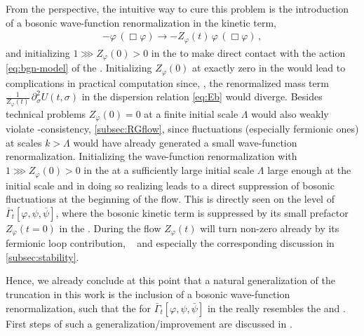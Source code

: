 From the \frg{} perspective, the intuitive way to cure this problem is the introduction of a bosonic wave-function renormalization in the kinetic term,
\begin{align}
	- \varphi \, ( \Box \varphi ) \rightarrow - Z_{\varphi} ( t ) \, \varphi \, ( \Box \varphi ) \, ,
\end{align}
and initializing ${1 \ggg Z_{\varphi} ( 0 )>0}$ in the \uv{} to make direct contact with the action \eqref{eq:bgn-model} of the \bgnm{}.
Initializing $Z_{\varphi} ( 0 )$ at exactly zero in the \uv{} would lead to complications in practical computation since, \eg{}, the renormalized mass term $\tfrac{1}{Z_\varphi ( t )} \, \partial_\sigma^2 U ( t, \sigma )$ in the dispersion relation \eqref{eq:Eb} would diverge. Besides technical problems $Z_{\varphi} ( 0 )=0$ at a finite \uv{} initial scale $\Lambda$ would also weakly violate \rg{}-consistency, \cf{} \cref{subsec:RGflow}, since fluctuations (especially fermionic ones) at scales $k>\Lambda$ would have already generated a small wave-function renormalization.
Initializing the wave-function renormalization with ${1 \ggg Z_{\varphi} ( 0 )>0}$ in the \uv{} at a sufficiently large \uv{} initial scale $\Lambda$ \dash{} large enough  at the initial scale and in doing so realizing \rgcy{} \dash{} leads to a direct suppression of bosonic fluctuations at the beginning of the \frg{} flow.
This is directly seen on the level of $\bar{\Gamma}_t [\varphi, \psi,\bar{\psi}]$, where the bosonic kinetic term is suppressed by its small prefactor $Z_\varphi ( t = 0 )$ in the \uv{}.
During the \frg{} flow $Z_\varphi ( t )$ will turn non-zero already by its fermionic loop contribution, \cf{}\  and especially the corresponding discussion in \cref{subsec:stability}.
	
Hence, we already conclude at this point that a natural generalization of the \lpa{} truncation in this work is the inclusion of a bosonic wave-function renormalization, such that the \uv{} \ic{} for $\bar{\Gamma}_t [ \varphi, \psi,\bar{\psi}]$ in the \gnym{} really resembles the \bgn{} and \gnm{}.
First steps of such a generalization/improvement are discussed in .

